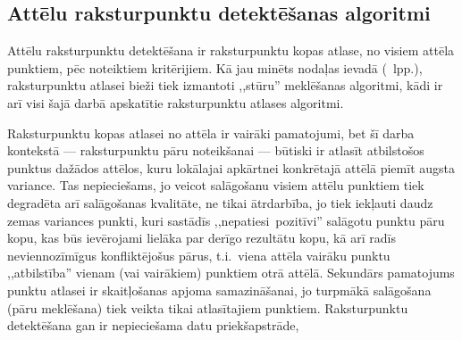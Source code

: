 \subsection{Attēlu raksturpunktu detektēšanas algoritmi} \label{sec:corners}
Attēlu raksturpunktu detektēšana ir raksturpunktu kopas atlase,
no visiem attēla punktiem, pēc noteiktiem
kritērijiem. Kā jau minēts nodaļas ievadā (\pageref{sec:algo}~lpp.),
raksturpunktu atlasei bieži tiek izmantoti ,,stūru'' meklēšanas algoritmi,
kādi ir arī visi šajā darbā apskatītie raksturpunktu atlases algoritmi.

Raksturpunktu kopas atlasei no attēla ir vairāki pamatojumi,
bet šī darba kontekstā
--- raksturpunktu pāru noteikšanai --- būtiski ir atlasīt atbilstošos punktus
dažādos attēlos, kuru lokālajai apkārtnei konkrētajā attēlā piemīt
augsta variance. Tas nepieciešams, jo veicot salāgošanu visiem attēlu punktiem tiek
degradēta arī salāgošanas kvalitāte, ne tikai ātrdarbība, jo tiek
iekļauti daudz zemas variances punkti, kuri sastādīs
,,nepatiesi~pozitīvi'' salāgotu punktu pāru kopu, kas būs ievērojami
lielāka par derīgo rezultātu kopu, kā arī radīs neviennozīmīgus
konfliktējošus pārus,
t.i.~viena attēla vairāku punktu ,,atbilstība'' vienam (vai vairākiem)
punktiem otrā attēlā.
Sekundārs pamatojums punktu atlasei ir
skaitļošanas apjoma samazināšanai, jo turpmākā salāgošana (pāru meklēšana)
tiek veikta
tikai atlasītajiem punktiem. Raksturpunktu detektēšana gan ir nepieciešama
datu priekšapstrāde, 


